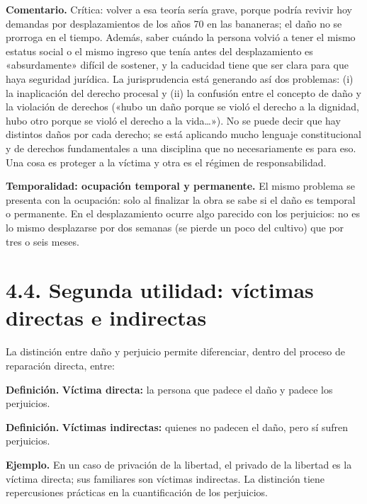 \begin{comentario}
\textcolor[HTML]{8A6D3B}{\textbf{Comentario. }}Crítica: volver a esa teoría sería grave, porque podría revivir hoy demandas por desplazamientos de los años 70 en las bananeras; el daño no se prorroga en el tiempo. Además, saber cuándo la persona volvió a tener el mismo estatus social o el mismo ingreso que tenía antes del desplazamiento es «absurdamente» difícil de sostener, y la caducidad tiene que ser clara para que haya seguridad jurídica. La jurisprudencia está generando así dos problemas: (i) la inaplicación del derecho procesal y (ii) la confusión entre el concepto de daño y la violación de derechos («hubo un daño porque se violó el derecho a la dignidad, hubo otro porque se violó el derecho a la vida…»). No se puede decir que hay distintos daños por cada derecho; se está aplicando mucho lenguaje constitucional y de derechos fundamentales a una disciplina que no necesariamente es para eso. Una cosa es proteger a la víctima y otra es el régimen de responsabilidad.
\end{comentario}
\textbf{Temporalidad: ocupación temporal y permanente.} El mismo problema se presenta con la ocupación: solo al finalizar la obra se sabe si el daño es temporal o permanente. En el desplazamiento ocurre algo parecido con los perjuicios: no es lo mismo desplazarse por dos semanas (se pierde un poco del cultivo) que por tres o seis meses.

\section{4.4. Segunda utilidad: víctimas directas e indirectas}
La distinción entre daño y perjuicio permite diferenciar, dentro del proceso de reparación directa, entre:

\begin{definicion}
\textcolor[HTML]{1F3864}{\textbf{Definición. }}\textbf{Víctima directa: }la persona que padece el daño y padece los perjuicios.
\par
\textcolor[HTML]{1F3864}{\textbf{Definición. }}\textbf{Víctimas indirectas: }quienes no padecen el daño, pero sí sufren perjuicios.
\end{definicion}
\begin{ejemplo}
\textcolor[HTML]{4F6228}{\textbf{Ejemplo. }}En un caso de privación de la libertad, el privado de la libertad es la víctima directa; sus familiares son víctimas indirectas. La distinción tiene repercusiones prácticas en la cuantificación de los perjuicios.
\end{ejemplo}
